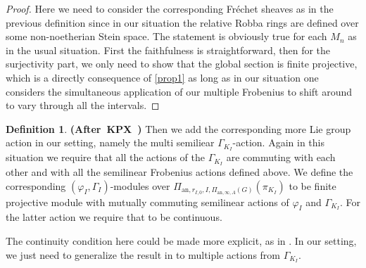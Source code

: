 \documentclass[12pt]{amsart}
\theoremstyle{definition}
\newtheorem{definition}[theorem]{Definition}
\numberwithin{equation}{section}
\begin{document}
\begin{proof}
Here we need to consider the corresponding Fr\'echet sheaves as in the previous definition since in our situation the relative Robba rings are defined over some non-noetherian Stein space. The statement is obviously true for each $M_n$ as in the usual situation. First the faithfulness is straightforward, then for the surjectivity part, we only need to show that the global section is finite projective, which is a directly consequence of \cref{prop1} as long as in our situation one considers the simultaneous application of our multiple Frobenius to shift around to vary through all the intervals.	
\end{proof}


\begin{definition} \mbox{\bf{(After KPX \cite[Definition 2.2.12]{KPX})}}
Then we add the corresponding more Lie group action in our setting, namely the multi semiliear $\Gamma_{K_I}$-action. Again in this situation we require that all the actions of the $\Gamma_{K_I}$ are commuting with each other and with all the semilinear Frobenius actions defined above. We define the corresponding $(\varphi_I,\Gamma_I)$-modules over $\Pi_{\mathrm{an},r_{I,0},I,\Pi_{\mathrm{an},\infty,A}(G)}(\pi_{K_I})$ to be finite projective module with mutually commuting semilinear actions of $\varphi_I$ and $\Gamma_{K_I}$. For the latter action we require that to be continuous.
\end{definition}


\indent The continuity condition here could be made more explicit, as in \cite[Proposition 2.2.14]{KPX}. In our setting, we just need to generalize the result in \cite[Proposition 2.2.14]{KPX} to multiple actions from $\Gamma_{K_I}$.
\end{document}
